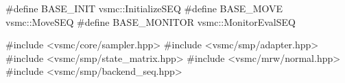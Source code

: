\begin{cppcode}
#define BASE_INIT    vsmc::InitializeSEQ
#define BASE_MOVE    vsmc::MoveSEQ
#define BASE_MONITOR vsmc::MonitorEvalSEQ

#include <vsmc/core/sampler.hpp>
#include <vsmc/smp/adapter.hpp>
#include <vsmc/smp/state_matrix.hpp>
#include <vsmc/mrw/normal.hpp>
#include <vsmc/smp/backend_seq.hpp>
\end{cppcode}
